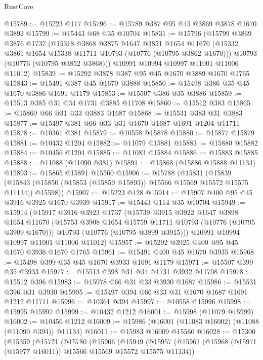 \begin{lexlean}{RustCore}
\begin{coremodule}
@15789 := @15223 @117
@15796 := @15789 @387 @95 @45 @3869 @3878 @1670 @3892
@15799 := @15443 @68 @35 @10704
@15831 := @15796
    (@15799
      @3869
      @3876
      @1737
      (@15318
        @3868
        @3875
        @1647
        @3851
        @1654
        @11670
        (@15332 @3861 @1654 @15338 @11711 @10793 (@10776 (@10795 @3862 @1670)))
        @10793
        (@10776 (@10795 @3852 @3868)))
      @10991
      @10994
      @10997
      @11001
      @11006
      @11012)
@15839 := @15292 @3878 @387 @95 @45 @1670 @3889 @1670 @1765
@15843 := @15491 @387 @45 @1670 @3888
@15850 := @15498 @386 @35 @45 @1670 @3886 @1691 @1179
@15853 := @15507 @386 @35 @3886
@15859 := @15513 @385 @31 @34 @1731 @3885 @11708
@15860 := @15512 @383
@15865 := @15860 @66 @31 @33 @3883 @1687
@15868 := @15531 @383 @31 @3883
@15877 := @15497 @381 @66 @33 @31 @1670 @1687 @1691 @1204 @11711
@15878 := @10361 @381
@15879 := @10558 @15878
@15880 := @15877 @15879
@15881 := @10432 @1204
@15882 := @11079 @15881
@15883 := @15880 @15882
@15884 := @10456 @1204
@15885 := @11083 @15884
@15886 := @15883 @15885
@15888 := @11088 (@11090 @381)
@15891 := @15868 (@15886 @15888 @11134)
@15893 := @15865 @15891 @15560
@15906 := @15788
    (@15831
      (@15839 (@15843 (@15850 (@15853 (@15859 @15893)) @15566 @15569 @15572 @15575 @11134)) @15598))
@15907 := @15223 @128
@15914 := @15907 @400 @95 @45 @3916 @3925 @1670 @3939
@15917 := @15443 @114 @35 @10704
@15949 := @15914
    (@15917
      @3916
      @3923
      @1737
      (@15739
        @3915
        @3922
        @1647
        @3898
        @1654
        @11670
        (@15753 @3908 @1654 @15759 @11711 @10793 (@10776 (@10795 @3909 @1670)))
        @10793
        (@10776 (@10795 @3899 @3915)))
      @10991
      @10994
      @10997
      @11001
      @11006
      @11012)
@15957 := @15292 @3925 @400 @95 @45 @1670 @3936 @1670 @1765
@15961 := @15491 @400 @45 @1670 @3935
@15968 := @15498 @399 @35 @45 @1670 @3933 @1691 @1179
@15971 := @15507 @399 @35 @3933
@15977 := @15513 @398 @31 @34 @1731 @3932 @11708
@15978 := @15512 @396
@15983 := @15978 @66 @31 @33 @3930 @1687
@15986 := @15531 @396 @31 @3930
@15995 := @15497 @394 @66 @33 @31 @1670 @1687 @1691 @1212 @11711
@15996 := @10361 @394
@15997 := @10558 @15996
@15998 := @15995 @15997
@15999 := @10432 @1212
@16001 := @15998 (@11079 @15999)
@16002 := @10456 @1212
@16009 := @15986 (@16001 (@11083 @16002) (@11088 (@11090 @394)) @11134)
@16011 := @15983 @16009 @15560
@16028 := @15300
    (@15359
      (@15721
        (@15780
          (@15906
            (@15949
              (@15957
                (@15961 (@15968 (@15971 (@15977 @16011)) @15566 @15569 @15572 @15575 @11134))

\end{coremodule}
\end{lexlean}
